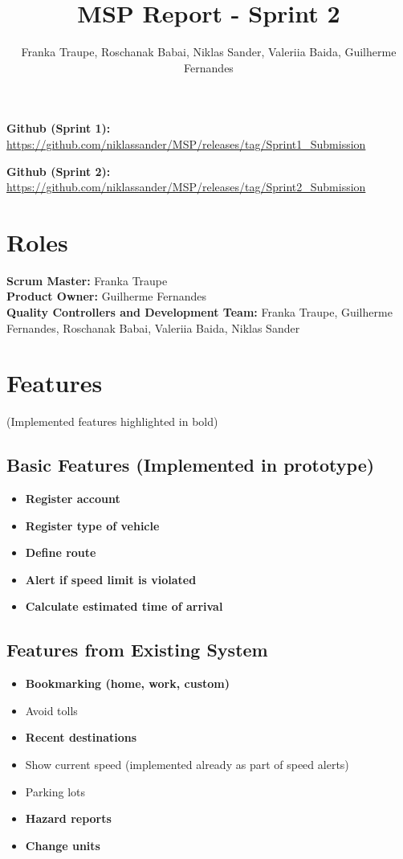 \documentclass{article}
\title{MSP Report - Sprint 2}
\author{Franka Traupe, Roschanak Babai, Niklas Sander, Valeriia Baida, Guilherme Fernandes}
\date{}
\begin{document}
\maketitle

\textbf{Github (Sprint 1):} \url{https://github.com/niklassander/MSP/releases/tag/Sprint1_Submission}

\textbf{Github (Sprint 2):} \url{https://github.com/niklassander/MSP/releases/tag/Sprint2_Submission}

\section*{Roles}
\textbf{Scrum Master:} Franka Traupe\\
\textbf{Product Owner:} Guilherme Fernandes\\
\textbf{Quality Controllers and Development Team:} Franka Traupe, Guilherme Fernandes, Roschanak Babai, Valeriia Baida, Niklas Sander\\

\section*{Features}
(Implemented features highlighted in bold)

\subsection*{Basic Features (Implemented in prototype)}
\begin{itemize}
    \item \textbf{Register account}
    \item \textbf{Register type of vehicle}
    \item \textbf{Define route}
    \item \textbf{Alert if speed limit is violated}
    \item \textbf{Calculate estimated time of arrival}
\end{itemize}

\subsection*{Features from Existing System}
\begin{itemize}
    \item \textbf{Bookmarking (home, work, custom)}
    \item Avoid tolls
    \item \textbf{Recent destinations}
    \item Show current speed (implemented already as part of speed alerts)
    \item Parking lots
    \item \textbf{Hazard reports}
    \item \textbf{Change units}
\end{itemize}
\end{document}
